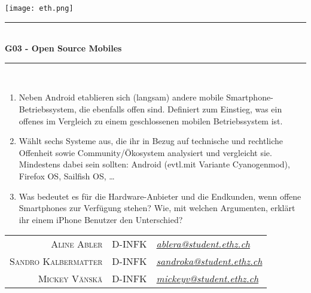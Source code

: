 \begin{titlepage}

	\begin{flushright}
		{\texttt{[image: eth.png]}}
	\end{flushright}
	
	\begin{center}
		\vspace*{2\baselineskip}
		\rule{\linewidth}{0.5mm}\\[3mm]
		\textbf{\huge G03 - Open Source Mobiles}\\
		\rule{\linewidth}{0.5mm}\\
		\vspace{\baselineskip}
	\end{center}
	
	\begin{large}
	
		\begin{enumerate}[leftmargin=*]
		    \item Neben Android etablieren sich (langsam) andere mobile Smartphone-Betriebssystem, die ebenfalls offen sind. Definiert zum Einstieg, was ein offenes im Vergleich zu einem geschlossenen mobilen Betriebssystem ist.
	
		    \item Wählt sechs Systeme aus, die ihr in Bezug auf technische und rechtliche Offenheit sowie Community/Ökosystem analysiert und vergleicht sie. Mindestens dabei sein sollten: Android (evtl.\@ mit Variante Cyanogenmod), Firefox OS, Sailfish OS, \ldots
	
		    \item Was bedeutet es für die Hardware-Anbieter und die Endkunden, wenn offene Smartphones zur Verfügung stehen? Wie, mit welchen Argumenten, erklärt ihr einem iPhone Benutzer den Unterschied?
		\end{enumerate}
	
		\begin{center}
		
			\vfill
			\begin{tabular}{r@{, }c@{, }l}
				\textsc{Aline Abler} &D-INFK & \href{mailto:ablera@student.ethz.ch}{\emph{ablera@student.ethz.ch}}\\
				\textsc{Sandro Kalbermatter} &D-INFK & \href{mailto:sandroka@student.ethz.ch}{\emph{sandroka@student.ethz.ch}}\\
				\textsc{Mickey Vänskä} & D-INFK & \href{mailto:mickeyv@student.ethz.ch}{\emph{mickeyv@student.ethz.ch}}\\
			\end{tabular}
			\vspace{2\baselineskip}
	

\end{center}
\end{large}
\end{titlepage}

